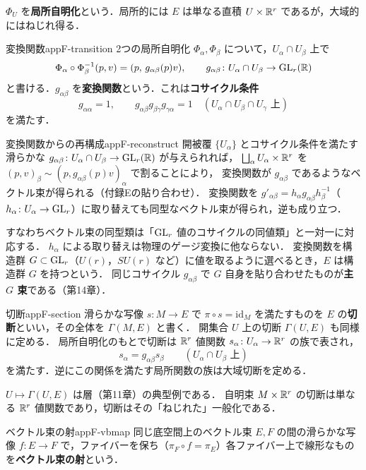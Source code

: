 $\Phi_U$ を\textbf{局所自明化}という．局所的には $E$ は単なる直積 $U\times\mathbb{R}^r$ であるが，大域的にはねじれ得る．

\begin{mydef}{変換関数}{appF-transition}
2つの局所自明化 $\Phi_\alpha,\Phi_\beta$ について，$U_\alpha\cap U_\beta$ 上で
\[
\Phi_\alpha\circ\Phi_\beta^{-1}(p,v)=(p,\,g_{\alpha\beta}(p)v),\qquad g_{\alpha\beta}\colon U_\alpha\cap U_\beta\to\operatorname{GL}_r(\mathbb{R})
\]
と書ける．$g_{\alpha\beta}$ を\textbf{変換関数}という．これは\textbf{コサイクル条件}
\[
g_{\alpha\alpha}=1,\qquad g_{\alpha\beta}g_{\beta\gamma}g_{\gamma\alpha}=1\quad(U_\alpha\cap U_\beta\cap U_\gamma\text{ 上})
\]
を満たす．
\end{mydef}

\begin{mythm}{変換関数からの再構成}{appF-reconstruct}
開被覆 $\{U_\alpha\}$ とコサイクル条件を満たす滑らかな $g_{\alpha\beta}\colon U_\alpha\cap U_\beta\to\operatorname{GL}_r(\mathbb{R})$ が与えられれば，
$\bigsqcup_\alpha U_\alpha\times\mathbb{R}^r$ を $(p,v)_\beta\sim(p,g_{\alpha\beta}(p)v)_\alpha$ で割ることにより，
変換関数が $g_{\alpha\beta}$ であるようなベクトル束が得られる（付録Eの貼り合わせ）．
変換関数を $g'_{\alpha\beta}=h_\alpha g_{\alpha\beta}h_\beta^{-1}$（$h_\alpha\colon U_\alpha\to\operatorname{GL}_r$）に取り替えても同型なベクトル束が得られ，逆も成り立つ．
\end{mythm}

すなわちベクトル束の同型類は「$\operatorname{GL}_r$ 値のコサイクルの同値類」と一対一に対応する．
$h_\alpha$ による取り替えは物理のゲージ変換に他ならない．
変換関数を構造群 $G\subset\operatorname{GL}_r$（$U(r)$，$SU(r)$ など）に値を取るように選べるとき，$E$ は構造群 $G$ を持つという．
同じコサイクル $g_{\alpha\beta}$ で $G$ 自身を貼り合わせたものが\textbf{主 $G$ 束}である（第14章）．

\begin{mydef}{切断}{appF-section}
滑らかな写像 $s\colon M\to E$ で $\pi\circ s=\mathrm{id}_M$ を満たすものを $E$ の\textbf{切断}といい，その全体を $\Gamma(M,E)$ と書く．
開集合 $U$ 上の切断 $\Gamma(U,E)$ も同様に定める．
局所自明化のもとで切断は $\mathbb{R}^r$ 値関数 $s_\alpha\colon U_\alpha\to\mathbb{R}^r$ の族で表され，
\[
s_\alpha=g_{\alpha\beta}s_\beta\qquad(U_\alpha\cap U_\beta\text{ 上})
\]
を満たす．逆にこの関係を満たす局所関数の族は大域切断を定める．
\end{mydef}

$U\mapsto\Gamma(U,E)$ は層（第11章）の典型例である．
自明束 $M\times\mathbb{R}^r$ の切断は単なる $\mathbb{R}^r$ 値関数であり，切断はその「ねじれた」一般化である．

\begin{mydef}{ベクトル束の射}{appF-vbmap}
同じ底空間上のベクトル束 $E,F$ の間の滑らかな写像 $f\colon E\to F$ で，ファイバーを保ち（$\pi_F\circ f=\pi_E$）各ファイバー上で線形なものを\textbf{ベクトル束の射}という．
\end{mydef}

